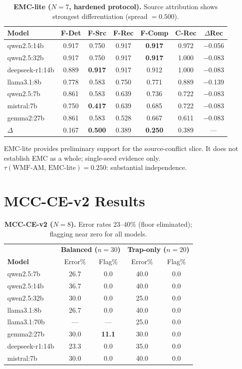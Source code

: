 \documentclass{article}
\begin{document}
\begin{table}[h]
\centering
\small
\caption{\textbf{EMC-lite ($N{=}7$, hardened protocol).}
Source attribution shows strongest differentiation (spread $= 0.500$).}
\label{tab:emclite}
\begin{tabular}{lcccccc}
\toprule
Model & F-Det & F-Src & F-Rec & F-Comp & C-Rec & $\Delta$Rec \\
\midrule
qwen2.5:14b     & 0.917 & 0.750 & 0.917 & \textbf{0.917} & 0.972 & $-$0.056 \\
qwen2.5:32b     & 0.917 & 0.750 & 0.917 & \textbf{0.917} & 1.000 & $-$0.083 \\
deepseek-r1:14b & 0.889 & \textbf{0.917} & 0.917 & 0.912 & 1.000 & $-$0.083 \\
llama3.1:8b     & 0.778 & 0.583 & 0.750 & 0.771 & 0.889 & $-$0.139 \\
qwen2.5:7b      & 0.861 & 0.583 & 0.639 & 0.736 & 0.722 & $-$0.083 \\
mistral:7b      & 0.750 & \textbf{0.417} & 0.639 & 0.685 & 0.722 & $-$0.083 \\
gemma2:27b      & 0.861 & 0.583 & 0.528 & 0.667 & 0.611 & $-$0.083 \\
\midrule
$\Delta$ & 0.167 & \textbf{0.500} & 0.389 & \textbf{0.250} & 0.389 & — \\
\bottomrule
\end{tabular}
\end{table}

EMC-lite provides preliminary support for the source-conflict slice.
It does not establish EMC as a whole; single-seed evidence only.
$\tau(\text{WMF-AM, EMC-lite}) = 0.250$: substantial independence.

\section{MCC-CE-v2 Results}
\label{app:mccv2}

\begin{table}[h]
\centering
\small
\caption{\textbf{MCC-CE-v2 ($N{=}8$).} Error rates 23--40\% (floor
eliminated); flagging near zero for all models.}
\label{tab:mcc_v2}
\begin{tabular}{lcc|cc}
\toprule
& \multicolumn{2}{c|}{\textbf{Balanced ($n{=}30$)}} & \multicolumn{2}{c}{\textbf{Trap-only ($n{=}20$)}} \\
\textbf{Model} & Error\% & Flag\% & Error\% & Flag\% \\
\midrule
qwen2.5:7b      & 26.7 & 0.0 & 40.0 & 0.0 \\
qwen2.5:14b     & 36.7 & 0.0 & 40.0 & 0.0 \\
qwen2.5:32b     & 30.0 & 0.0 & 25.0 & 0.0 \\
llama3.1:8b     & 26.7 & 0.0 & 40.0 & 0.0 \\
llama3.1:70b    & ---  & --- & 25.0 & 0.0 \\
gemma2:27b      & 30.0 & \textbf{11.1} & 30.0 & 0.0 \\
deepseek-r1:14b & 23.3 & 0.0 & 35.0 & 0.0 \\
mistral:7b      & 30.0 & 0.0 & 40.0 & 0.0 \\
\bottomrule
\end{tabular}
\end{table}
\end{document}
